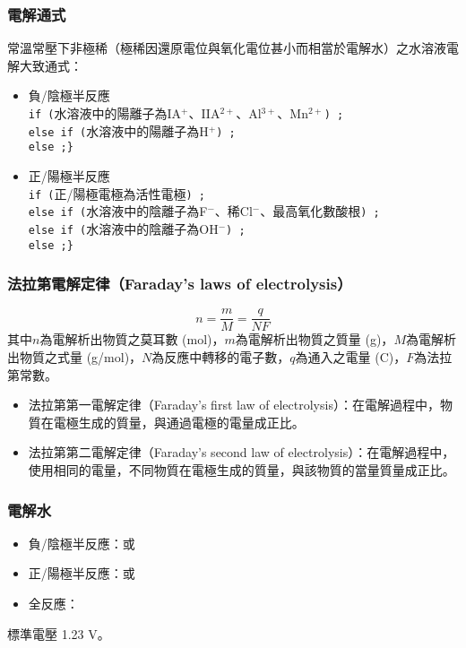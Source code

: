\documentclass[a4paper,12pt]{article}
\begin{document}
\subsubsection{電解通式}
常溫常壓下非極稀（極稀因還原電位與氧化電位甚小而相當於電解水）之水溶液電解大致通式：
\begin{itemize}
\item 負/陰極半反應\text{\ \{}\\
\texttt{if\ (}水溶液中的陽離子為IA$^{+}$、IIA$^{2+}$、Al$^{3+}$、Mn$^{2+}$\texttt{)\ }\texttt{;}\\
\texttt{else if\ (}水溶液中的陽離子為H$^+$\texttt{)\ }\texttt{;}\\
\texttt{else\ }\texttt{;}\texttt{\}}
\item 正/陽極半反應\text{\ \{}\\
\texttt{if\ (}正/陽極電極為活性電極\texttt{)\ }\texttt{;}\\
\texttt{else if\ (}水溶液中的陰離子為F$^-$、稀Cl$^-$、最高氧化數酸根\texttt{)\ }\texttt{;}\\
\texttt{else if\ (}水溶液中的陰離子為OH$^-$\texttt{)\ }\texttt{;}\\
\texttt{else\ }\texttt{;}\texttt{\}}
\end{itemize}
\subsubsection{法拉第電解定律（Faraday's laws of electrolysis）}
\[n=\frac{m}{M}=\frac{q}{NF}\]
其中$n$為電解析出物質之莫耳數 (mol)，$m$為電解析出物質之質量 (g)，$M$為電解析出物質之式量 (g/mol)，$N$為反應中轉移的電子數，$q$為通入之電量 (C)，$F$為法拉第常數。
\begin{itemize}
\item 法拉第第一電解定律（Faraday's first law of electrolysis）：在電解過程中，物質在電極生成的質量，與通過電極的電量成正比。
\item 法拉第第二電解定律（Faraday's second law of electrolysis）：在電解過程中，使用相同的電量，不同物質在電極生成的質量，與該物質的當量質量成正比。
\end{itemize}
\subsubsection{電解水}
\begin{itemize}
\item 負/陰極半反應：或
\item 正/陽極半反應：或
\item 全反應：
\end{itemize}
標準電壓 1.23 V。
\end{document}
